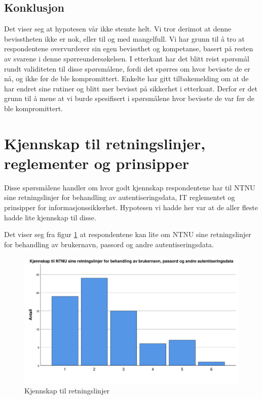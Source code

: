\subsection{Konklusjon}
Det viser seg at hypotesen vår ikke stemte helt. Vi tror derimot at denne bevisstheten ikke er nok, eller til og med mangelfull. Vi har grunn til å tro at respondentene overvurderer sin egen bevissthet og kompetanse, basert på resten av svarene i denne spørreundersøkelsen. I etterkant har det blitt reist spørsmål rundt validiteten til disse spørsmålene, fordi det spørres om hvor bevisste de er nå, og ikke før de ble kompromittert. Enkelte har gitt tilbakemelding om at de har endret sine rutiner og blitt mer bevisst på sikkerhet i etterkant. Derfor er det grunn til å mene at vi burde spesifisert i spørsmålene hvor bevisste de var før de ble kompromittert.
\section{Kjennskap til retningslinjer, reglementer og prinsipper}
Disse spørsmålene handler om hvor godt kjennskap respondentene har til NTNU sine retningslinjer for behandling av autentiseringsdata, IT reglementet og prinsipper for informasjonssikkerhet. Hypotesen vi hadde her var at de aller fleste hadde lite kjennskap til disse.

Det viser seg fra figur \ref{fig:retningslinjer} at respondentene kan lite om NTNU sine retningslinjer for behandling av brukernavn, passord og andre autentiseringsdata. 
\begin{figure}[H]
    \centering
    \includegraphics[scale=0.5]{case_2/bilder/spss/retningslinjer.pdf}
    \caption[retningslinjer]{Kjennskap til retningslinjer}
    \label{fig:retningslinjer}
\end{figure}

